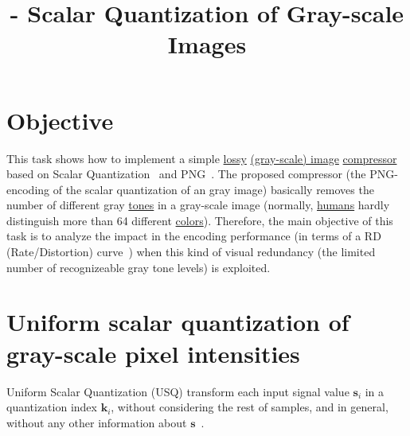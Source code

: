 

\title{\SM{} - Scalar Quantization of Gray-scale Images}

\maketitle
\tableofcontents

\section{Objective}
This task shows how to implement a simple
\href{https://en.wikipedia.org/wiki/Lossy_compression}{lossy}
\href{https://en.wikipedia.org/wiki/Grayscale}{(gray-scale) image}
\href{https://en.wikipedia.org/wiki/Image_compression}{compressor}~\cite{vruiz__image_IO}
based on Scalar
Quantization~\cite{vruiz__scalar_quantization,sayood2017introduction,vetterli2014foundations}
and PNG~\cite{vruiz__PNG}. The proposed compressor (the PNG-encoding
of the scalar quantization of an gray image) basically removes the number
of different gray
\href{https://en.wikipedia.org/w/index.php?title=Tone_(color)&redirect=no}{tones}
in a gray-scale image (normally,
\href{https://en.wikipedia.org/wiki/Visual_system}{humans} hardly
distinguish more than 64 different
\href{https://en.wikipedia.org/wiki/Color}{colors}). Therefore, the
main objective of this task is to analyze the impact in the encoding
performance (in terms of a RD (Rate/Distortion)
curve~\cite{vruiz__information_theory}) when this kind of visual
redundancy (the limited number of recognizeable gray tone levels) is
exploited.

\section{Uniform scalar quantization of gray-scale pixel intensities}
Uniform Scalar Quantization (USQ) transform each input signal value
$\mathbf{s}_i$ in a quantization index $\mathbf{k}_i$, without
considering the rest of samples, and in general, without any other
information about $\mathbf{s}$~\cite{vruiz__scalar_quantization}.

